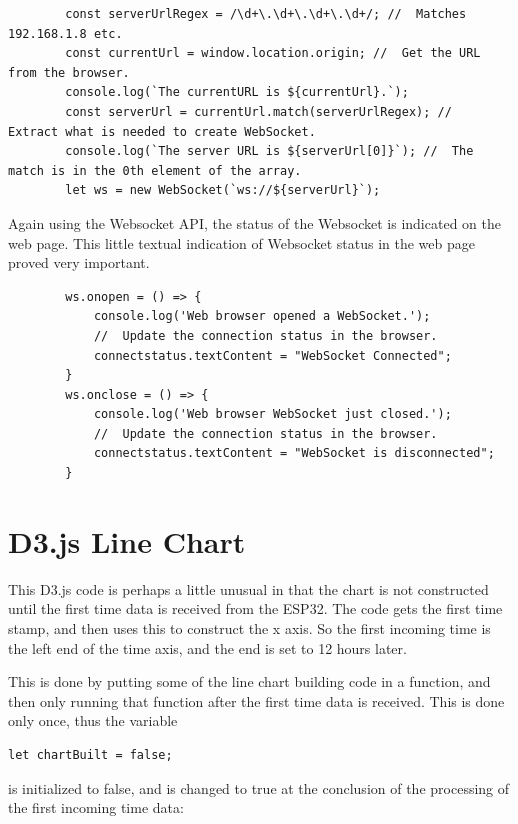 \documentclass[letterpaper,]{book}
\begin{document}
\begin{verbatim}
        const serverUrlRegex = /\d+\.\d+\.\d+\.\d+/; //  Matches 192.168.1.8 etc.
        const currentUrl = window.location.origin; //  Get the URL from the browser.
        console.log(`The currentURL is ${currentUrl}.`);
        const serverUrl = currentUrl.match(serverUrlRegex); //  Extract what is needed to create WebSocket.
        console.log(`The server URL is ${serverUrl[0]}`); //  The match is in the 0th element of the array.
        let ws = new WebSocket(`ws://${serverUrl}`);
\end{verbatim}

Again using the Websocket API, the status of the Websocket is indicated
on the web page. This little textual indication of Websocket status in
the web page proved very important.

\begin{verbatim}
        ws.onopen = () => {
            console.log('Web browser opened a WebSocket.');
            //  Update the connection status in the browser.
            connectstatus.textContent = "WebSocket Connected";
        }
        ws.onclose = () => {
            console.log('Web browser WebSocket just closed.');
            //  Update the connection status in the browser.
            connectstatus.textContent = "WebSocket is disconnected";
        }
\end{verbatim}

\section{D3.js Line Chart}\label{d3.js-line-chart}

This D3.js code is perhaps a little unusual in that the chart is not
constructed until the first time data is received from the ESP32. The
code gets the first time stamp, and then uses this to construct the x
axis. So the first incoming time is the left end of the time axis, and
the end is set to 12 hours later.

This is done by putting some of the line chart building code in a
function, and then only running that function after the first time data
is received. This is done only once, thus the variable

\begin{verbatim}
let chartBuilt = false;
\end{verbatim}

is initialized to false, and is changed to true at the conclusion of the
processing of the first incoming time data:
\end{document}
